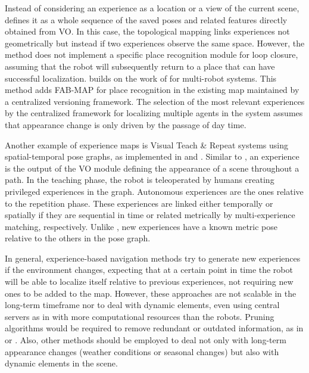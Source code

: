 Instead of considering an experience as a location or a view of the current scene, \cite{churchill-newman:2013:0278364913499193} defines it as a whole sequence of the saved poses and related features directly obtained from VO. In this case, the topological mapping links experiences not geometrically but instead if two experiences observe the same space. However, the method does not implement a specific place recognition module for loop closure, assuming that the robot will subsequently return to a place that can have successful localization.
\cite{gadd-newman:2016:7759843} builds on the work of \cite{churchill-newman:2013:0278364913499193} for multi-robot systems. This method adds FAB-MAP for place recognition in the existing map maintained by a centralized versioning framework. The selection of the most relevant experiences by the centralized framework for localizing multiple agents in the system assumes that appearance change is only driven by the passage of day time.

Another example of experience maps is Visual Teach \& Repeat systems using spatial-temporal pose graphs, as implemented in \cite{mactavish-et-al:2018:21838} and \cite{zhang-et-al:2018:8460674}.
Similar to \cite{churchill-newman:2013:0278364913499193}, an experience is the output of the VO module defining the appearance of a scene throughout a path. In the teaching phase, the robot is teleoperated by humans creating privileged experiences in the graph.
Autonomous experiences are the ones relative to the repetition phase. These experiences are linked either temporally or spatially if they are sequential in time or related metrically by multi-experience matching, respectively.
Unlike \cite{churchill-newman:2013:0278364913499193}, new experiences have a known metric pose relative to the others in the pose graph.

In general, experience-based navigation methods try to generate new experiences if the environment changes, expecting that at a certain point in time the robot will be able to localize itself relative to previous experiences, not requiring new ones to be added to the map.
However, these approaches are not scalable in the long-term timeframe nor to deal with dynamic elements, even using central servers as in \cite{gadd-newman:2016:7759843} with more computational resources than the robots.
Pruning algorithms would be required to remove redundant or outdated information, as in \cite{konolige-bowman:2009:5354121} or \cite{tang-et-al:2019:7}.
Also, other methods should be employed to deal not only with long-term appearance changes (weather conditions or seasonal changes) but also with dynamic elements in the scene.





